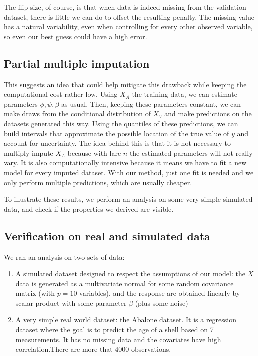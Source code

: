 \documentclass[12pt, a4paper]{memoir}
\begin{document}
The flip size, of course, is that when data is indeed missing from the validation dataset, there is little we can do to offset the resulting penalty. The missing value has a natural variability, even when controlling for every other observed variable, so even our best guess could have a high error. 

\subsection{Partial multiple imputation}
This suggests an idea that could help mitigate this drawback while keeping the computational cost rather low. Using $X_A$ the training data, we can estimate parameters $\phi, \psi, \beta$ as usual. Then, keeping these parameters constant, we can make draws from the conditional distribution of $X_V$ and make predictions on the datasets generated this way. Using the quantiles of these predictions, we can build intervals that approximate the possible location of the true value of $y$ and account for uncertainty. The idea behind this is that it is not necessary to multiply impute $X_A$ because with lare $n$ the estimated parameters will not really vary. It is also computationally intensive because it means we have to fit a new model for every imputed dataset. With our method, just one fit is needed and we only perform multiple predictions, which are usually cheaper.

To illustrate these results, we perform an analysis on some very simple simulated data, and check if the properties we derived are visible.
		\subsection{Verification on real and simulated data}
We ran an analysis on two sets of data:
\begin{enumerate}
\item A simulated dataset designed to respect the assumptions of our model: the $X$ data is generated as a multivariate normal for some random covariance matrix (with $p=10$ variables), and the response are obtained linearly by scalar product with some parameter $\beta$ (plus some noise)
\item A very simple real world dataset: the Abalone dataset. It is a regression dataset where the goal is to predict the age of a shell based on 7 measurements. It has no missing data and the covariates have high correlation.There are more that 4000 observations.
\end{enumerate}
\end{document}
